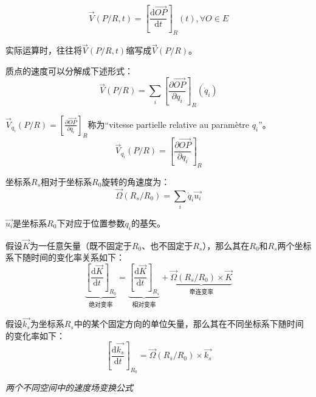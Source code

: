 \documentclass[UTF8]{ctexart}%
\begin{document}
\begin{equation}
\overrightarrow{V}\left(P/R, t\right)=\left[\frac{\mathrm{d}\overrightarrow{OP}}{\mathrm{d}t}\right]_R\left(t\right), \forall O \in E 
\end{equation}

实际运算时，往往将$\overrightarrow{V}\left(P/R, t\right)$缩写成$\overrightarrow{V}\left(P/R\right)$。

质点的速度可以分解成下述形式：
\begin{equation}
\overrightarrow{V}\left(P/R\right)=\sum_i \left[\frac{\partial \overrightarrow{OP}}{\partial q_i}\right]_R\left(\dot{q}_i\right)
\label{eq:vitessedunpointP}
\end{equation}

$\overrightarrow{V}_{q_i}\left(P/R\right)=\left[\frac{\partial \overrightarrow{OP}}{\partial q_i}\right]_R$称为``vitesse partielle relative au paramètre $q_i$''。
\begin{equation}
\overrightarrow{V}_{q_i}\left(P/R\right)=\left[\frac{\partial \overrightarrow{OP}}{\partial q_i}\right]_R
\label{eq:vitesserelativedunpointP}
\end{equation}

坐标系$R_s$相对于坐标系$R_0$旋转的角速度为：
\begin{equation}
\overrightarrow{\Omega}\left(R_s/R_0\right)=\sum_i \dot{q}_i \overrightarrow{u_i}
\end{equation}

$\overrightarrow{u_i}$是坐标系$R_0$下对应于位置参数$q_i$的基矢。

假设$\overrightarrow{K}$为一任意矢量（既不固定于$R_0$、也不固定于$R_s$），那么其在$R_0$和$R_s$两个坐标系下随时间的变化率关系如下：
\begin{equation}
\underbrace{\left[\frac{\mathrm{d}\overrightarrow{K}}{\mathrm{d}t}\right]_{R_0}}_{\text{绝对变率}}=\underbrace{\left[\frac{\mathrm{d}\overrightarrow{K}}{\mathrm{d}t}\right]_{R_s}}_{\text{相对变率}}+\underbrace{\overrightarrow{\Omega}\left(R_s/R_0\right)\times \overrightarrow{K}}_{\text{牵连变率}}
\end{equation}

假设$\overrightarrow{k_s}$为坐标系$R_s$中的某个固定方向的单位矢量，那么其在不同坐标系下随时间的变化率如下：
\begin{equation}
\left[\frac{\mathrm{d}\overrightarrow{k_s}}{\mathrm{d}t}\right]_{R_0}=\overrightarrow{\Omega}\left(R_s/R_0\right)\times\overrightarrow{k_s}
\end{equation}

\emph{两个不同空间中的速度场变换公式}
\end{document}
